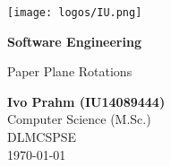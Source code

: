 \def\usesf{}
\let\usesf\sffamily %

\newsavebox{\Tutorin}


\setlength{\unitlength}{1pt}

\begin{titlepage}
\vspace{-39pt}\hspace*{300pt}\texttt{[image: logos/IU.png]}

\begin{center}
\hbox{}
\vfill
{\usesf}
{\huge\bfseries Software Engineering \par}
\vskip 1.8cm
Paper Plane Rotations\\[2mm]
\vskip 1cm

{\large\bfseries Ivo Prahm (IU14089444)\\}
\vskip 1.2cm
Computer Science (M.Sc.)\\
DLMCSPSE\\
\today %
\vskip 3cm
\begin{tabular}{p{3cm}l}
\end{tabular}
\vfill
\end{center}

\end{titlepage}


